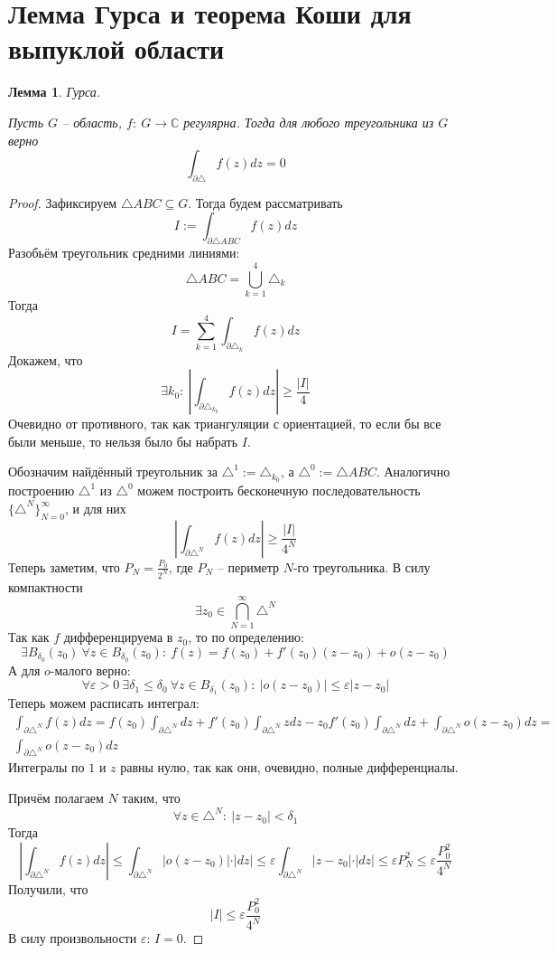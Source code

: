 \documentclass[a4paper,12pt]{article}
\renewcommand{\leq}{\ensuremath{\leqslant}}
\renewcommand{\geq}{\ensuremath{\geqslant}}
\theoremstyle{plain}
\newtheorem{lemma}{Лемма}[section]
\theoremstyle{definition}
\theoremstyle{remark}
\begin{document}
\section{Лемма Гурса и теорема Коши для выпуклой области}
\begin{lemma}
	Гурса.

	Пусть $G$ -- область, $f :\: G \to \mathbb{C}$ регулярна. Тогда для любого треугольника из $G$ верно
	\[
		\int_{\partial\triangle} f(z)dz = 0
	\]
\end{lemma}

\begin{proof}
	Зафиксируем $\triangle ABC \subseteq G$. Тогда будем рассматривать
	\[
		I := \int_{\partial\triangle ABC}f(z)dz
	\]
	Разобьём треугольник средними линиями:
	\[
		\triangle ABC = \bigcup_{k = 1}^4 \triangle_k
	\]
	Тогда
	\[
		I = \sum_{k = 1}^4 \int_{\partial \triangle_k}f(z)dz
	\]
	Докажем, что
	\[
		\exists k_0 :\: \left\vert \int_{\partial \triangle_{k_0}}f(z)dz\right\vert \geq \frac{\vert I\vert}{4}
	\]
	Очевидно от противного, так как триангуляции с ориентацией, то если бы все были меньше, то нельзя было бы набрать $I$.

	Обозначим найдённый треугольник за $\triangle^1 := \triangle_{k_0}$, а $\triangle^0 := \triangle ABC$. Аналогично построению $\triangle^1$ из $\triangle^0$ можем построить бесконечную последовательность $\{\triangle^N\}_{N = 0}^\infty$, и для них
	\[
		\left\vert \int_{\partial \triangle^N}f(z)dz\right\vert \geq \frac{\vert I\vert}{4^N}
	\]
	Теперь заметим, что $P_N = \frac{P_0}{2^N}$, где $P_N$ -- периметр $N$-го треугольника. В силу компактности
	\[
		\exists z_0 \in \bigcap_{N = 1}^\infty \triangle^N
	\]
	Так как $f$ дифференцируема в $z_0$, то по определению:
	\[
		\exists B_{\delta_0}(z_0) \: \forall z \in B_{\delta_0}(z_0) :\: f(z) = f(z_0) + f'(z_0)(z - z_0) + o(z - z_0)
	\]
	А для $o$-малого верно:
	\[
		\forall \varepsilon > 0 \: \exists \delta_1 \leq \delta_0 \: \forall z \in B_{\delta_1}(z_0) :\: \vert o(z - z_0)\vert \leq \varepsilon\vert z - z_0\vert
	\]
	Теперь можем расписать интеграл:
	\begin{align*}
		\int_{\partial\triangle^N}f(z)dz = f(z_0)\int_{\partial\triangle^N}dz + f'(z_0)\int_{\partial\triangle^N}zdz - z_0f'(z_0)\int_{\partial\triangle^N} dz + \int_{\partial\triangle^N}o(z - z_0)dz = \\
		\int_{\partial\triangle^N}o(z - z_0)dz
	\end{align*}
	Интегралы по $1$ и $z$ равны нулю, так как они, очевидно, полные дифференциалы.

	Причём полагаем $N$ таким, что
	\[
		\forall z \in \triangle^N :\: \vert z - z_0\vert < \delta_1
	\]
	Тогда
	\[
		\left\vert\int_{\partial\triangle^N} f(z)dz\right\vert \leq \int_{\partial\triangle^N} \vert o(z - z_0)\vert\cdot\vert dz\vert \leq \varepsilon\int_{\partial\triangle^N} \vert z - z_0\vert\cdot\vert dz\vert \leq \varepsilon P_N^2 \leq \varepsilon\frac{P_0^2}{4^N}
	\]
	Получили, что
	\[
		\vert I\vert \leq \varepsilon\frac{P_0^2}{4^N}
	\]
	В силу произвольности $\varepsilon$: $I = 0$.
\end{proof}
\end{document}
